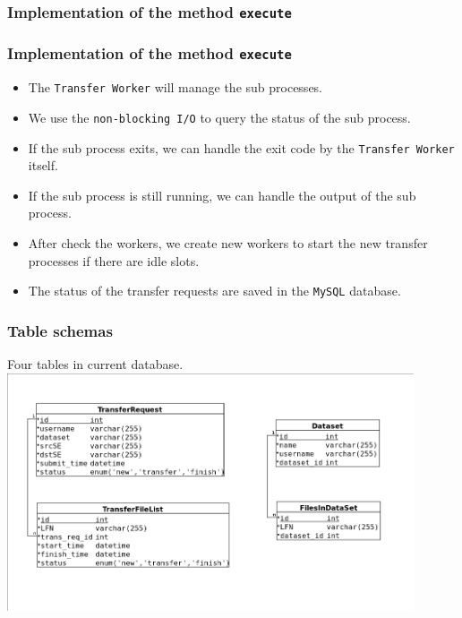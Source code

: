 \begin{frame}
    \frametitle{Implementation of the method {\tt execute}}
    \par\usebox{\TransferAgentExecute}
\end{frame}

\begin{frame}
    \frametitle{Implementation of the method {\tt execute}}
    \begin{itemize}
        \item The {\tt Transfer Worker} will manage the sub processes.
        \item We use the {\tt non-blocking I/O} to query 
              the status of the sub process.
        \item If the sub process exits, we can handle the exit 
              code by the {\tt Transfer Worker} itself.
        \item If the sub process is still running, we can 
              handle the output of the sub process.
        \item After check the workers, we create new workers
              to start the new transfer processes if there are
              idle slots.
        \item The status of the transfer requests are saved 
              in the {\tt MySQL} database.
    \end{itemize}
\end{frame}

\begin{frame}
    \frametitle{Table schemas}
    \begin{block}{Four tables in current database.}
    \includegraphics[width=12cm,keepaspectratio]{data/TransferDB.png}
    \end{block}
\end{frame}
